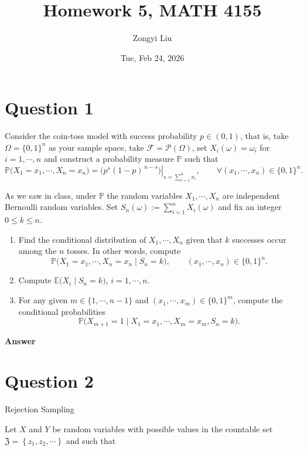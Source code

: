 \documentclass[letterpaper]{article}
\title{Homework 5, MATH 4155}
\author{Zongyi Liu}
\date{Tue, Feb 24, 2026}
\begin{document}
		\maketitle
		\section{Question 1}
		
		Consider the coin-toss model with success probability $p \in (0,1)$, that is, take $\Omega = \{0,1\}^n$ as your sample space, take $\mathcal{F} = \mathcal{P}(\Omega)$, set $X_i(\omega) = \omega_i$ for $i=1,\cdots,n$ and construct a probability measure $\mathbb{P}$ such that
		\[
		\mathbb{P}\bigl(X_1 = x_1, \cdots, X_n = x_n\bigr)
		=
		\left.\bigl(p^{s}(1-p)^{\,n-s}\bigr)\right|_{s=\sum_{i=1}^n x_i},
		\qquad
		\forall (x_1,\cdots,x_n)\in\{0,1\}^n.
		\]
		
		As we saw in class, under $\mathbb{P}$ the random variables $X_1,\cdots,X_n$ are independent Bernoulli random variables. Set $S_n(\omega):=\sum_{i=1}^n X_i(\omega)$ and fix an integer $0\le k\le n$.
		
		\begin{enumerate}
			\item[(i)] Find the conditional distribution of $X_1,\cdots,X_n$ given that $k$ successes occur among the $n$ tosses. In other words, compute
			\[
			\mathbb{P}\bigl(X_1=x_1,\cdots,X_n=x_n \mid S_n=k\bigr),
			\qquad
			(x_1,\cdots,x_n)\in\{0,1\}^n.
			\]
			
			\item[(ii)] Compute $\mathbb{E}\bigl(X_i \mid S_n=k\bigr)$, $i=1,\cdots,n$.
			
			\item[(iii)] For any given $m\in\{1,\cdots,n-1\}$ and $(x_1,\cdots,x_m)\in\{0,1\}^m$, compute the conditional probabilities
			\[
			\mathbb{P}\bigl(X_{m+1}=1 \mid X_1=x_1,\cdots,X_m=x_m,S_n=k\bigr).
			\]
		\end{enumerate}
		
		\textbf{Answer}
		
		\clearpage
		
		\section{Question 2}

		{\color{deepred} Rejection Sampling}
		
		Let $X$ and $Y$ be random variables with possible values in the countable set $\mathfrak{Z}=\left\{z_{1}, z_{2}, \cdots\right\}$ and such that
		
\end{document}
